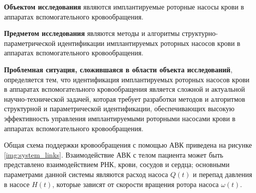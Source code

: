 % 
% 

\textbf{Объектом исследования} являются имплантируемые роторные насосы крови в аппаратах вспомогательного кровообращения.

\textbf{Предметом исследования} являются методы и алгоритмы структурно-параметрической идентификации имплантируемых роторных насосов крови в аппаратах вспомогательного кровообращения.

\textbf{Проблемная ситуация, сложившаяся в области объекта исследований}, определяется тем, что идентификация имплантируемых роторных насосов крови в аппаратах вспомогательного кровообращения является сложной и актуальной научно-технической задачей, которая требует разработки методов и алгоритмов структурной и параметрической идентификации, обеспечивающих высокую эффективность управления имплантируемыми роторными насосами крови в аппаратах вспомогательного кровообращения. 

Общая схема поддержки кровообращения с помощью АВК приведена на рисунке \ref{img:system_links}. Взаимодействие АВК с телом пациента может быть представлено взаимодействием РНК, крови, сосудов и сердца; основными параметрами данной системы являются расход насоса $Q(t)$ и перепад давления в насосе $H(t)$, которые зависят от скорости вращения ротора насоса $\omega(t)$. %

